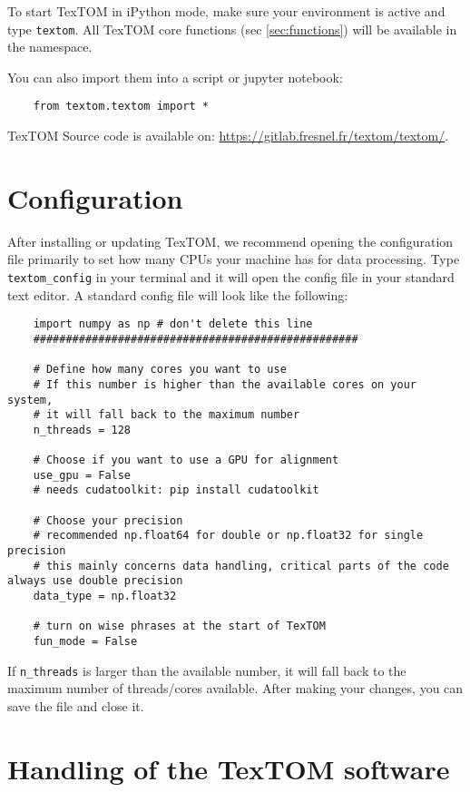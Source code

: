 To start TexTOM in iPython mode, make sure your environment is active and type \texttt{textom}.
All TexTOM core functions (sec \ref{sec:functions}) will be available in the namespace.

You can also import them into a script or jupyter notebook:
\begin{verbatim}
    from textom.textom import *
\end{verbatim}

TexTOM Source code is available on:
\url{https://gitlab.fresnel.fr/textom/textom/}.



\newpage
\section{Configuration}
After installing or updating TexTOM, we recommend opening the configuration file primarily to set how many CPUs your machine has
for data processing. Type \texttt{textom\_config} in your terminal and it will open the config file in your standard
text editor. A standard config file will look like the following:
\begin{verbatim}
    import numpy as np # don't delete this line
    ##################################################

    # Define how many cores you want to use 
    # If this number is higher than the available cores on your system, 
    # it will fall back to the maximum number
    n_threads = 128 

    # Choose if you want to use a GPU for alignment
    use_gpu = False
    # needs cudatoolkit: pip install cudatoolkit

    # Choose your precision
    # recommended np.float64 for double or np.float32 for single precision
    # this mainly concerns data handling, critical parts of the code always use double precision
    data_type = np.float32

    # turn on wise phrases at the start of TexTOM
    fun_mode = False
\end{verbatim}
If \texttt{n\_threads} is larger than the available number, it will fall back to the maximum number of threads/cores available.
After making your changes, you can save the file and close it.
\newpage

\section{Handling of the TexTOM software}

